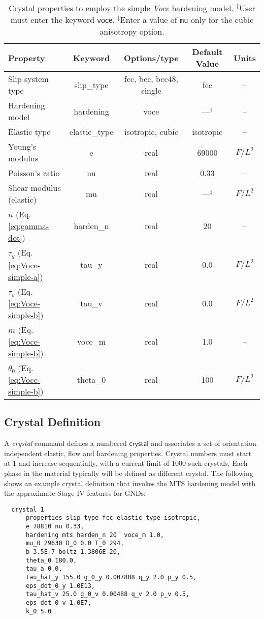 \documentclass[11pt]{report}
\numberwithin{equation}{section}
\newcommand{\ttt} {\texttt}  %
\newcommand{\hv} {\mathsf}   %
\newcommand{\ti}{\emph}
\begin{document}
\begin{table}[htbp]
\small
\centering
\setlength{\extrarowheight}{3pt}

\begin{tabular}{|l|c|c|c|c|}
\hline 
\textbf{Property} & \textbf{Keyword} & \textbf{Options/type}&\textbf{Default Value}&\textbf{Units}\tabularnewline
\hline \hline
Slip system type & slip\_type & fcc, bcc, bcc48, single&fcc&--\tabularnewline \hline
Hardening model & hardening &voce&---$^\dag$&--\tabularnewline \hline
Elastic type & elastic\_type & isotropic, cubic&isotropic&--\tabularnewline \hline
Young's modulus & e & real&69000&$F/L^2$\tabularnewline \hline
Poisson's ratio & nu & real&0.33&--\tabularnewline \hline
Shear modulus (elastic) & mu & real&---$^\ddag$&$F/L^2$\tabularnewline \hline
$n$ (Eq. \ref{eq:gamma-dot}) & harden\_n & real&20&--\tabularnewline \hline
$\tau_y$ (Eq. \ref{eq:Voce-simple-a}) & tau\_y & real&0.0&$F/L^2$\tabularnewline \hline
$\tau_v$ (Eq. \ref{eq:Voce-simple-b}) & tau\_v & real&0.0&$F/L^2$\tabularnewline \hline
$m$ (Eq. \ref{eq:Voce-simple-b}) & voce\_m & real&1.0&--\tabularnewline \hline
$\theta_0$ (Eq. \ref{eq:Voce-simple-b}) & theta\_0 & real& 100&$F/L^2$\tabularnewline \hline
\end{tabular}
\caption{Crystal properties to employ the simple \ti{Voce}  hardening model. $^\dag$User must
enter the keyword $\hv{voce}$.
$^\ddag$Enter a value of  \ttt{mu} only
for the cubic anisotropy option.
\label{tab:crys-voce}}
\normalsize
\end{table}



\subsection{Crystal Definition}
A \ti{crystal} command defines a numbered $\hv{crystal}$ and
associates a set of orientation independent 
elastic, flow and hardening properties.  
Crystal numbers must start at 1 and increase sequentially, with a current limit
of 1000 such crystals.
Each phase in the material typically will be defined as different crystal.  
The
following shows an example crystal definition that invokes the
MTS hardening model with the approximate Stage IV
features for GNDs:

\small
\begin{verbatim}
  crystal 1
      properties slip_type fcc elastic_type isotropic,
      e 78810 nu 0.33,
      hardening mts harden_n 20  voce_m 1.0,
      mu_0 29630 D_0 0.0 T_0 294,
      b 3.5E-7 boltz 1.3806E-20,
      theta_0 180.0,
      tau_a 0.0,
      tau_hat_y 155.0 g_0_y 0.007808 q_y 2.0 p_y 0.5,
      eps_dot_0_y 1.0E13,
      tau_hat_v 25.0 g_0_v 0.00488 q_v 2.0 p_v 0.5,
      eps_dot_0_v 1.0E7, 
      k_0 5.0
\end{verbatim}
\normalsize
\end{document}
